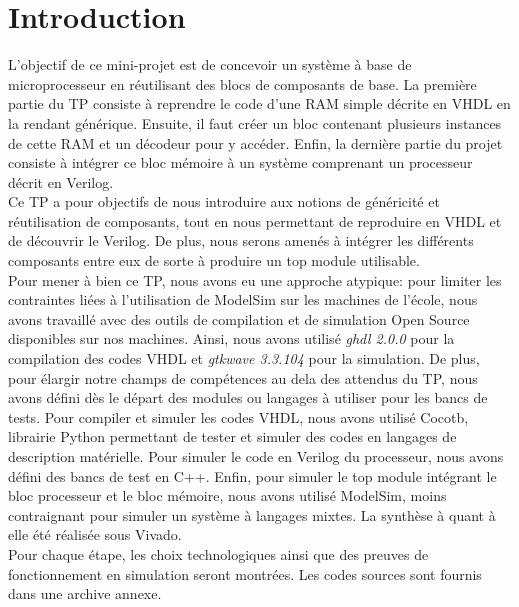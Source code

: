 \section{Introduction}


\indent L'objectif de ce mini-projet est de concevoir un système à base de microprocesseur en réutilisant des blocs de composants de base. La première partie du TP consiste à reprendre le code d'une RAM simple décrite en VHDL en la rendant générique. Ensuite, il faut créer un bloc contenant plusieurs instances de cette RAM et un décodeur pour y accéder. Enfin, la dernière partie du projet consiste à intégrer ce bloc mémoire à un système comprenant un processeur décrit en Verilog. \\
\indent Ce TP a pour objectifs de nous introduire aux notions de généricité et réutilisation de composants, tout en nous permettant de reproduire en VHDL et de découvrir le Verilog. De plus, nous serons amenés à intégrer les différents composants entre eux de sorte à produire un top module utilisable. \\
\indent Pour mener à bien ce TP, nous avons eu une approche atypique: pour limiter les contraintes liées à l'utilisation de ModelSim sur les machines de l'école, nous avons travaillé avec des outils de compilation et de simulation Open Source disponibles sur nos machines. Ainsi, nous avons utilisé \textit{ghdl 2.0.0} pour la compilation des codes VHDL et \textit{gtkwave 3.3.104} pour la simulation. De plus, pour élargir notre champs de compétences au dela des attendus du TP, nous avons défini dès le départ des modules ou langages à utiliser pour les bancs de tests. Pour compiler et simuler les codes VHDL, nous avons utilisé Cocotb, librairie Python permettant de tester et simuler des codes en langages de description matérielle. Pour simuler le code en Verilog du processeur, nous avons défini des bancs de test en C++. Enfin, pour simuler le top module intégrant le bloc processeur et le bloc mémoire, nous avons utilisé ModelSim, moins contraignant pour simuler un système à langages mixtes. La synthèse à quant à elle été réalisée sous Vivado. \\
\indent Pour chaque étape, les choix technologiques ainsi que des preuves de fonctionnement en simulation seront montrées. Les codes sources sont fournis dans une archive annexe.


